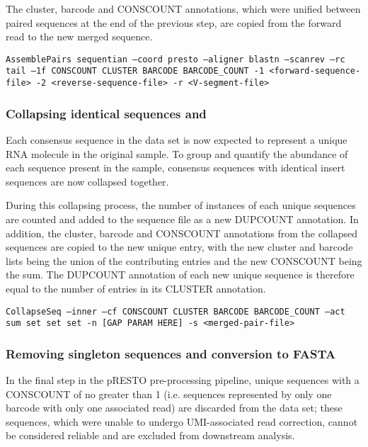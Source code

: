 The cluster, barcode and CONSCOUNT annotations, which were unified between paired sequences at the end of the previous step, are copied from the forward read to the new merged sequence.

\texttt{AssemblePairs sequentian --coord presto --aligner blastn --scanrev --rc tail --1f CONSCOUNT~CLUSTER~BARCODE~BARCODE\_COUNT -1 <forward-sequence-file> -2 <reverse-sequence-file> -r <V-segment-file>}

\subsubsection{Collapsing identical sequences and}

Each consensus sequence in the data set is now expected to represent a unique RNA molecule in the original sample. To group and quantify the abundance of each sequence present in the sample, consensus sequences with identical insert sequences are now collapsed together. 

During this collapsing process, the number of instances of each unique sequences are counted and added to the sequence file as a new DUPCOUNT annotation. In addition, the cluster, barcode and CONSCOUNT annotations from the collapsed sequences are copied to the new unique entry, with the new cluster and barcode lists being the union of the contributing entries and the new CONSCOUNT being the sum. The DUPCOUNT annotation of each new unique sequence is therefore equal to the number of entries in its CLUSTER annotation.

\texttt{CollapseSeq --inner --cf CONSCOUNT CLUSTER BARCODE BARCODE\_COUNT --act sum set set set -n [GAP PARAM HERE] -s <merged-pair-file>}


\subsubsection{Removing singleton sequences and conversion to FASTA}

In the final step in the pRESTO pre-processing pipeline, unique sequences with a CONSCOUNT of no greater than 1 (i.e. sequences represented by only one barcode with only one associated read) are discarded from the data set; these sequences, which were unable to undergo UMI-associated read correction, cannot be considered reliable and are excluded from downstream analysis. %

